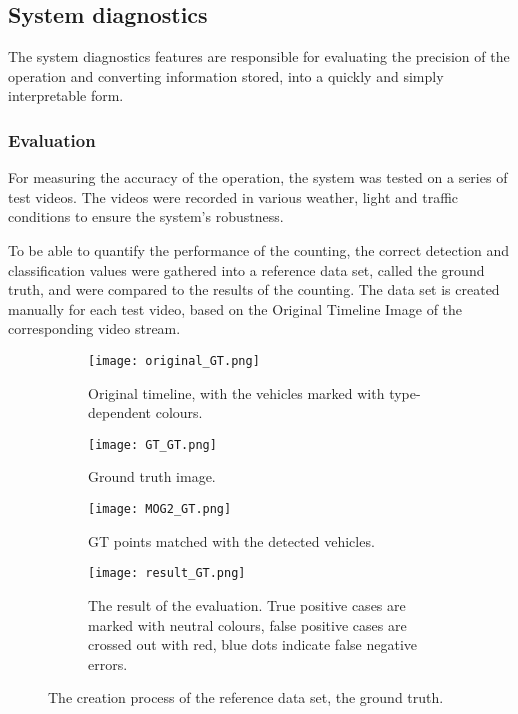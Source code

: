 \subsection{System diagnostics}
The system diagnostics features are responsible for evaluating the precision of the operation and converting information stored, into a quickly and simply interpretable form.
\subsubsection{Evaluation}\label{chap:evaluation}
For measuring the accuracy of the operation, the system was tested on a series of test videos.
The videos were recorded in various weather, light and traffic conditions to ensure the system's robustness.

To be able to quantify the performance of the counting, the correct detection and classification values were gathered into a reference data set, called the ground truth, and were compared to the results of the counting.
The data set is created manually for each test video, based on the Original Timeline Image of the corresponding video stream.

\begin{figure}[!h]
	\centering
	\begin{subfigure}[!h]{0.9\textwidth}
		\texttt{[image: original\_GT.png]}
		\caption{Original timeline, with the vehicles marked with type-dependent colours.\label{fig:GT_original}}
	\end{subfigure}
	\hfill
	\begin{subfigure}[!h]{0.9\textwidth}
		\texttt{[image: GT\_GT.png]}
		\caption{Ground truth image.\label{fig:GT_GT}}
	\end{subfigure}
	\hfill
	\begin{subfigure}[!h]{0.9\textwidth}
		\texttt{[image: MOG2\_GT.png]}
		\caption{GT points matched with the detected vehicles. \label{fig:GT_MOG}}
	\end{subfigure}
	\hfill
	\begin{subfigure}[!h]{0.9\textwidth}
		\texttt{[image: result\_GT.png]}
		\caption{The result of the evaluation. True positive cases are marked with neutral colours, false positive cases are crossed out with red, blue dots indicate false negative errors.\label{fig:GT_result}}
	\end{subfigure}
	\caption{The creation process of the reference data set, the ground truth.\label{fig:GT}}
\end{figure}

